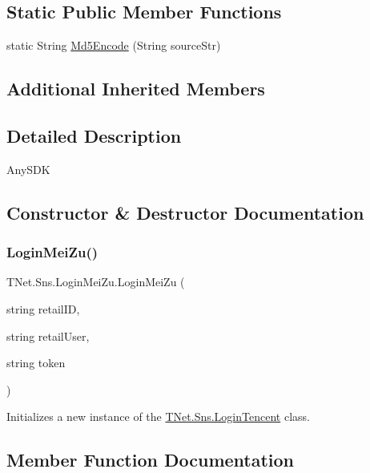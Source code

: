 \subsection*{Static Public Member Functions}
\begin{DoxyCompactItemize}
\item 
static String \mbox{\hyperlink{class_t_net_1_1_sns_1_1_login_mei_zu_ac4d6da6b035c8556bc4e81d1f3ed849b}{Md5\+Encode}} (String source\+Str)
\end{DoxyCompactItemize}
\subsection*{Additional Inherited Members}


\subsection{Detailed Description}
Any\+S\+DK 



\subsection{Constructor \& Destructor Documentation}
\mbox{\label{class_t_net_1_1_sns_1_1_login_mei_zu_abf60b74152173025a024bd1c21b2bc2f}} 
\subsubsection{\texorpdfstring{Login\+Mei\+Zu()}{LoginMeiZu()}}
{\footnotesize\ttfamily T\+Net.\+Sns.\+Login\+Mei\+Zu.\+Login\+Mei\+Zu (\begin{DoxyParamCaption}\item[{string}]{retail\+ID,  }\item[{string}]{retail\+User,  }\item[{string}]{token }\end{DoxyParamCaption})}



Initializes a new instance of the \mbox{\hyperlink{class_t_net_1_1_sns_1_1_login_tencent}{T\+Net.\+Sns.\+Login\+Tencent}} class. 



\subsection{Member Function Documentation}
\mbox{\label{class_t_net_1_1_sns_1_1_login_mei_zu_a75e7963ccdc475af8d4378efc4becf70}} 
